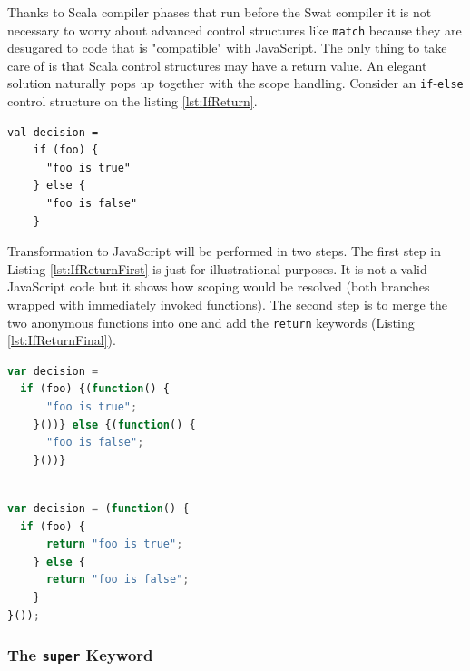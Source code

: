 \documentclass[12pt,a4paper]{report}
\begin{document}
Thanks to Scala compiler phases that run before the Swat compiler it is not necessary to worry about advanced control structures like \texttt{match} because they are desugared to code that is "compatible" with JavaScript. The only thing to take care of is that Scala control structures may have a return value. An elegant solution naturally pops up together with the scope handling. Consider an \texttt{if}-\texttt{else} control structure on the listing \ref{lst:IfReturn}.

\begin{minipage}{\linewidth}
\begin{lstlisting}[caption={A condition with return value.},label={lst:IfReturn}]
val decision = 
	if (foo) {
	  "foo is true"
	} else {
	  "foo is false"
	}
\end{lstlisting}
\end{minipage}

Transformation to JavaScript will be performed in two steps. The first step in Listing \ref{lst:IfReturnFirst} is just for illustrational purposes. It is not a valid JavaScript code but it shows how scoping would be resolved (both branches wrapped with immediately invoked functions). The second step is to merge the two anonymous functions into one and add the \texttt{return} keywords (Listing \ref{lst:IfReturnFinal}).

\begin{center}
\begin{minipage}{.48\textwidth}
  \begin{lstlisting}[language=JavaScript,caption={The first step of condition compilation.},label={lst:IfReturnFirst},showlines=true]
var decision =
  if (foo) {(function() {
	  "foo is true";
	}())} else {(function() {
	  "foo is false";
	}())}
	
  \end{lstlisting}
\end{minipage}
\hfill
\begin{minipage}{.48\textwidth}
  \begin{lstlisting}[language=JavaScript,caption={The result of condition compilation.},label={lst:IfReturnFinal}]
var decision = (function() {
  if (foo) {
	  return "foo is true";
	} else {
	  return "foo is false";
	}
}());
  \end{lstlisting}
\end{minipage}
\end{center}

\subsubsection*{The \texttt{super} Keyword}
\end{document}
